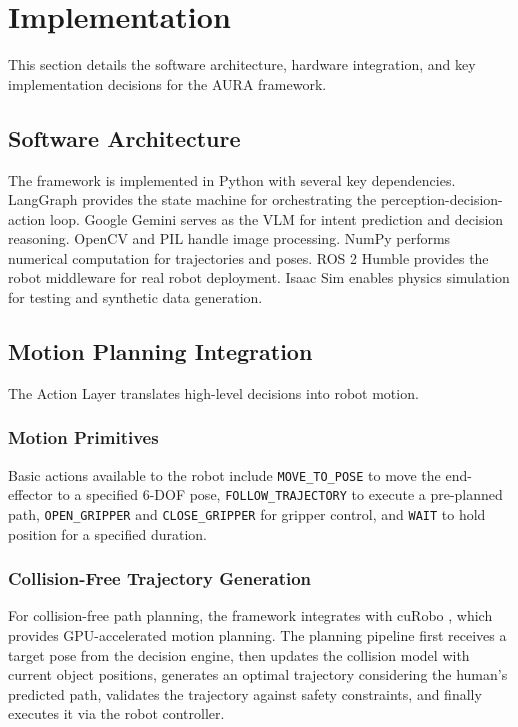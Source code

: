 \section{Implementation}
\label{sec:implementation}

This section details the software architecture, hardware integration, and key implementation decisions for the AURA framework.

\subsection{Software Architecture}

The framework is implemented in Python with several key dependencies. LangGraph provides the state machine for orchestrating the perception-decision-action loop. Google Gemini serves as the VLM for intent prediction and decision reasoning. OpenCV and PIL handle image processing. NumPy performs numerical computation for trajectories and poses. ROS 2 Humble provides the robot middleware for real robot deployment. Isaac Sim enables physics simulation for testing and synthetic data generation.

\subsection{Motion Planning Integration}

The Action Layer translates high-level decisions into robot motion.

\subsubsection{Motion Primitives}

Basic actions available to the robot include \texttt{MOVE\_TO\_POSE} to move the end-effector to a specified 6-DOF pose, \texttt{FOLLOW\_TRAJECTORY} to execute a pre-planned path, \texttt{OPEN\_GRIPPER} and \texttt{CLOSE\_GRIPPER} for gripper control, and \texttt{WAIT} to hold position for a specified duration.

\subsubsection{Collision-Free Trajectory Generation}

For collision-free path planning, the framework integrates with cuRobo \citep{Liu2023}, which provides GPU-accelerated motion planning. The planning pipeline first receives a target pose from the decision engine, then updates the collision model with current object positions, generates an optimal trajectory considering the human's predicted path, validates the trajectory against safety constraints, and finally executes it via the robot controller.

